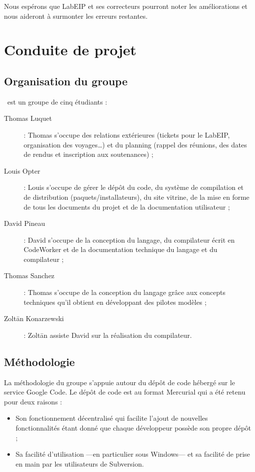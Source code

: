 \documentclass[francais]{rtxreport}
\begin{document}
Nous espérons que LabEIP et ses correcteurs pourront noter les améliorations et
nous aideront à surmonter les erreurs restantes.

\chapter{Conduite de projet}

\section{Organisation du groupe}

\rtx\ est un groupe de cinq étudiants :
\begin{description}
\item[Thomas Luquet] : Thomas s'occupe des relations extérieures (tickets pour
  le LabEIP, organisation des voyages\ldots) et du planning (rappel des
  réunions, des dates de rendus et inscription aux soutenances) ;
\item[Louis Opter] : Louis s'occupe de gérer le dépôt du code, du système de
  compilation et de distribution (paquets/installateurs), du site vitrine, de la
  mise en forme de tous les documents du projet et de la documentation
  utilisateur ;
\item[David Pineau] : David s'occupe de la conception du langage, du compilateur
  écrit en CodeWorker et de la documentation technique du langage et du
  compilateur ;
\item[Thomas Sanchez] : Thomas s'occupe de la conception du langage grâce aux
  concepts techniques qu'il obtient en développant des pilotes modèles ;
\item[Zolt\={a}n Konarzewski] : Zolt\={a}n assiste David sur la réalisation du
  compilateur.
\end{description}


\section{Méthodologie}

La méthodologie du groupe s'appuie autour du dépôt de code hébergé sur le
service Google Code. Le dépôt de code est au format Mercurial qui a été retenu
pour deux raisons :
\begin{itemize}
\item Son fonctionnement décentralisé qui facilite l'ajout de nouvelles
  fonctionnalités étant donné que chaque développeur possède son propre dépôt ;
\item Sa facilité d'utilisation ---en particulier sous Windows--- et sa facilité
  de prise en main par les utilisateurs de Subversion.
\end{itemize}
\end{document}
